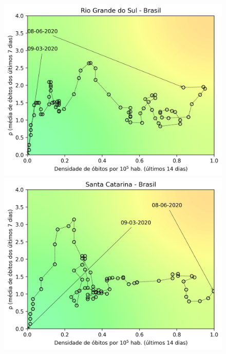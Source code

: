 \documentclass[]{article}
\begin{document}
\begin{figure}[!h]
	\begin{minipage}[t]{4cm}
		\centering
		\includegraphics[scale=0.5]{../RS.png}
	\end{minipage}
	\hspace{5cm}
	\begin{minipage}[t]{4cm}
		\centering
		\includegraphics[scale=0.5]{../SC.png}
		\vspace{0.2cm}
	\end{minipage}
\end{figure}

\newpage
\end{document}
